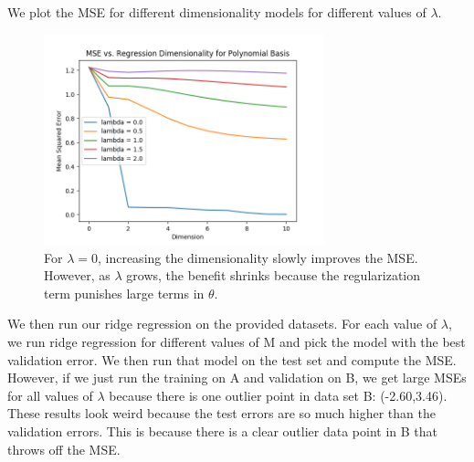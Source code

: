 \documentclass[8pt]{article}
\begin{document}
We plot the MSE for different dimensionality models for different values of $\lambda$.
%
\begin{figure}[H]
  \centering
  \includegraphics[width = 3.2in]{../P3/figs/poly_basis.png}
  \caption*{For $\lambda = 0$, increasing the dimensionality slowly improves the MSE. However, as $\lambda$ grows, the benefit shrinks because the regularization term punishes large terms in $\theta$.}
\end{figure}
%
We then run our ridge regression on the provided datasets. For each value of $\lambda$, we run ridge regression for different values of M and pick the model with the best validation error. We then run that model on the test set and compute the MSE. However, if we just run the training on A and validation on B, we get large MSEs for all values of $\lambda$ because there is one outlier point in data set B: (-2.60,3.46).
These results look weird because the test errors are so much higher than the validation errors. This is because there is a clear outlier data point in B that throws off the MSE.
\end{document}
